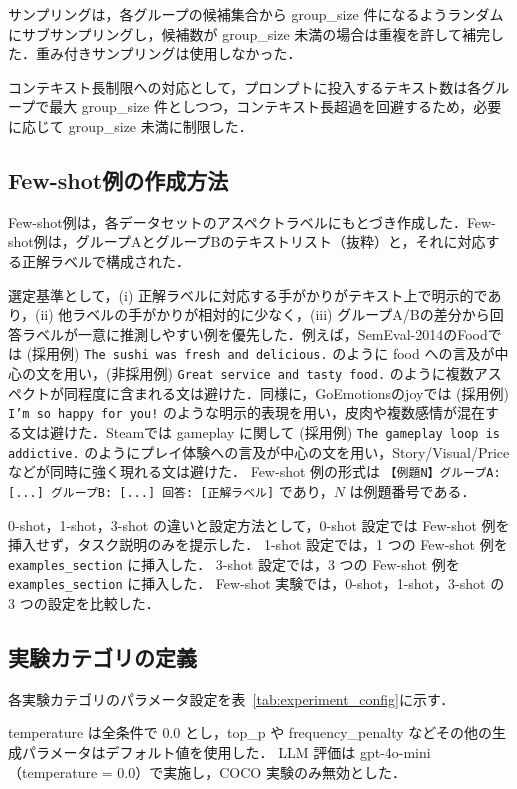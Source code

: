 サンプリングは，各グループの候補集合から group\_size 件になるようランダムにサブサンプリングし，候補数が group\_size 未満の場合は重複を許して補完した．重み付きサンプリングは使用しなかった．

コンテキスト長制限への対応として，プロンプトに投入するテキスト数は各グループで最大 group\_size 件としつつ，コンテキスト長超過を回避するため，必要に応じて group\_size 未満に制限した．

\subsection{Few-shot例の作成方法}
Few-shot例は，各データセットのアスペクトラベルにもとづき作成した．Few-shot例は，グループAとグループBのテキストリスト（抜粋）と，それに対応する正解ラベルで構成された．

選定基準として，(i) 正解ラベルに対応する手がかりがテキスト上で明示的であり，(ii) 他ラベルの手がかりが相対的に少なく，(iii) グループA/Bの差分から回答ラベルが一意に推測しやすい例を優先した．例えば，SemEval-2014のFoodでは (採用例) \texttt{The sushi was fresh and delicious.} のように food への言及が中心の文を用い，(非採用例) \texttt{Great service and tasty food.} のように複数アスペクトが同程度に含まれる文は避けた．同様に，GoEmotionsのjoyでは (採用例) \texttt{I'm so happy for you!} のような明示的表現を用い，皮肉や複数感情が混在する文は避けた．Steamでは gameplay に関して (採用例) \texttt{The gameplay loop is addictive.} のようにプレイ体験への言及が中心の文を用い，Story/Visual/Priceなどが同時に強く現れる文は避けた．
Few-shot 例の形式は \texttt{【例題N】グループA: [...] グループB: [...] 回答: [正解ラベル]} であり，$N$ は例題番号である．

0-shot，1-shot，3-shot の違いと設定方法として，0-shot 設定では Few-shot 例を挿入せず，タスク説明のみを提示した．
1-shot 設定では，1 つの Few-shot 例を \texttt{examples\_section} に挿入した．
3-shot 設定では，3 つの Few-shot 例を \texttt{examples\_section} に挿入した．
Few-shot 実験では，0-shot，1-shot，3-shot の 3 つの設定を比較した．

\subsection{実験カテゴリの定義}
各実験カテゴリのパラメータ設定を表~\ref{tab:experiment_config}に示す．

temperature は全条件で 0.0 とし，top\_p や frequency\_penalty などその他の生成パラメータはデフォルト値を使用した．
LLM 評価は gpt-4o-mini（temperature = 0.0）で実施し，COCO 実験のみ無効とした．

